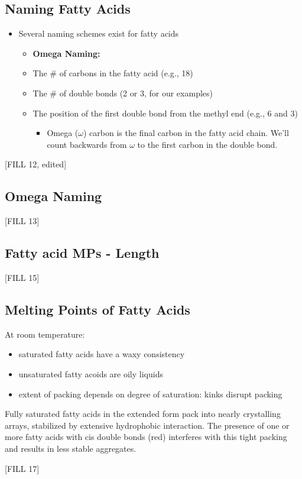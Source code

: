 \documentclass[10pt]{article}
\begin{document}
\subsection*{Naming Fatty Acids}
\begin{itemize}
    \item Several naming schemes exist for fatty acids
    \begin{itemize}
        \item \textbf{Omega Naming:}
        \item The # of carbons in the fatty acid (e.g., 18)
        \item The # of double bonds (2 or 3, for our examples)
        \item The position of the first double bond from the methyl end (e.g., 6 and 3)
        \begin{itemize}
            \item Omega ($\omega$) carbon is the final carbon in the fatty acid chain.  We'll count backwards from $\omega$ to the first carbon in the double bond.
        \end{itemize}
    \end{itemize}
\end{itemize}
\begin{center}
    [FILL 12, edited]
\end{center}

\subsection*{Omega Naming}
\begin{center}
    [FILL 13]
\end{center}

\subsection*{Fatty acid MPs - Length}
\begin{center}
    [FILL 15]
\end{center}

\subsection*{Melting Points of Fatty Acids}
At room temperature:
\begin{itemize}
    \item saturated fatty acids have a waxy consistency
    \item unsaturated fatty acoids are oily liquids
    \item extent of packing depends on degree of saturation: kinks disrupt packing
\end{itemize}
Fully saturated fatty acids in the extended form pack into nearly crystalling arrays, stabilized by extensive hydrophobic interaction.  The presence of one or more fatty acids with cis double bonds (red) interferes with this tight packing and results in less stable aggregates.
\begin{center}
    [FILL 17]
\end{center}
\end{document}
